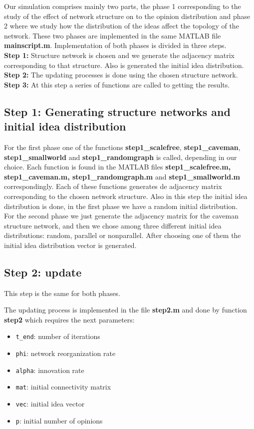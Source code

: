 Our simulation comprises mainly two parts, the phase 1 corresponding to the study  of the effect of network structure on to the opinion distribution and phase 2 where we study how the distribution of the ideas affect the topology of the network. These two phases are implemented in the same MATLAB file \textbf{mainscript.m}. Implementation of both phases is divided in three steps. 
\\

\noindent \textbf{Step 1:} Structure network is chosen and we generate the adjacency matrix corresponding to that structure. Also is generated the initial idea distribution.\\
\textbf{Step 2:} The updating processes is done using the chosen structure network.\\
\textbf{Step 3:} At this step a series of functions are called to getting the results.

\subsection{Step 1: Generating structure networks and initial idea distribution}

For the first phase one of the functions \textbf{step1\_scalefree}, \textbf{step1\_caveman},\\ \textbf{step1\_smallworld} and \textbf{step1\_randomgraph} is called, depending in our choice. Each function is found in the MATLAB files \textbf{step1\_scalefree.m, step1\_caveman.m, step1\_randomgraph.m} and \textbf{step1\_smallworld.m} correspondingly.  Each of these functions generates de adjacency matrix corresponding to the chosen network structure. Also in this step the initial idea distribution is done, in the first phase we have a random initial distribution. 
\\
For the second phase we just generate the adjacency matrix for the caveman structure network, and then we chose among three different initial idea distributions: random, parallel or nonparallel. After choosing one of them the initial idea distribution vector is generated.


\subsection{Step 2: update}

This step is the same for both phases.

The updating process is implemented in the file \textbf{step2.m} and done by function \textbf{step2} which requires the next parameters:
\begin{itemize}

\item \verb+t_end+: number of iterations
 \item \verb+phi+:  network reorganization rate
 \item \verb+alpha+: innovation rate
\item \verb+mat+: initial connectivity matrix
\item  \verb+vec+: initial idea vector
\item \verb+p+: initial number of opinions
 \end{itemize}
 
